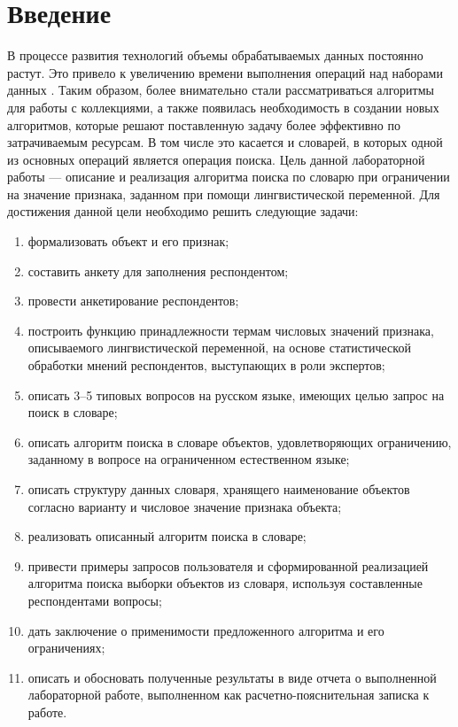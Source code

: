 \chapter*{Введение}
В процессе развития технологий объемы обрабатываемых данных постоянно растут. 
Это привело к увеличению времени выполнения операций над наборами данных \cite{def1}. 
Таким образом, более внимательно стали рассматриваться алгоритмы для работы с коллекциями, а также появилась необходимость в
создании новых алгоритмов, которые решают поставленную задачу более эффективно по затрачиваемым ресурсам. 
В том числе это касается и словарей, в которых одной из основных операций является операция поиска.
Цель данной лабораторной работы — описание и реализация алгоритма поиска по словарю при ограничении на значение признака, заданном при помощи лингвистической переменной.
Для достижения данной цели необходимо решить следующие задачи:
\begin{enumerate}[ 1{)}] 
	\item формализовать объект и его признак;
	\item составить анкету для заполнения респондентом;
	\item провести анкетирование респондентов;
	\item построить функцию принадлежности термам числовых значений признака, описываемого лингвистической переменной, на основе статистической обработки мнений респондентов, выступающих в роли экспертов;
	\item описать 3–5 типовых вопросов на русском языке, имеющих целью запрос на поиск в словаре;
	\item описать алгоритм поиска в словаре объектов, удовлетворяющих ограничению, заданному в вопросе на ограниченном естественном языке;
	\item описать структуру данных словаря, хранящего наименование объектов согласно варианту и числовое значение признака объекта;
	\item реализовать описанный алгоритм поиска в словаре;
	\item привести примеры запросов пользователя и сформированной реализацией алгоритма поиска выборки объектов из словаря, используя составленные респондентами вопросы;
	\item дать заключение о применимости предложенного алгоритма и его ограничениях;
	\item описать и обосновать полученные результаты в виде отчета о выполненной лабораторной работе, выполненном как расчетно-пояснительная записка к работе.
\end{enumerate}
